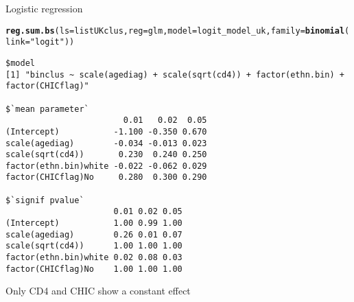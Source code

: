 \documentclass[]{revtex4}\usepackage[]{graphicx}\usepackage[]{color}
\makeatletter
\newcommand{\hlstr}[1]{\textcolor[rgb]{0.192,0.494,0.8}{#1}}%
\newcommand{\hlstd}[1]{\textcolor[rgb]{0.345,0.345,0.345}{#1}}%
\newcommand{\hlkwc}[1]{\textcolor[rgb]{0.333,0.667,0.333}{#1}}%
\newcommand{\hlkwd}[1]{\textcolor[rgb]{0.737,0.353,0.396}{\textbf{#1}}}%
\newenvironment{kframe}{%
 \def\at@end@of@kframe{}%
 \ifinner\ifhmode%
  \def\at@end@of@kframe{\end{minipage}}%
  \begin{minipage}{\columnwidth}%
 \fi\fi%
 \def\FrameCommand##1{\hskip\@totalleftmargin \hskip-\fboxsep
 \colorbox{shadecolor}{##1}\hskip-\fboxsep
     \hskip-\linewidth \hskip-\@totalleftmargin \hskip\columnwidth}%
 \MakeFramed {\advance\hsize-\width
   \@totalleftmargin\z@ \linewidth\hsize
   \@setminipage}}%
 {\par\unskip\endMakeFramed%
 \at@end@of@kframe}
\newenvironment{knitrout}{}{} %
\makeatother
\begin{document}
Logistic regression
\begin{knitrout}
\color{fgcolor}\begin{kframe}
\begin{alltt}
\hlkwd{reg.sum.bs}\hlstd{(}\hlkwc{ls} \hlstd{= listUKclus,} \hlkwc{reg} \hlstd{= glm,} \hlkwc{model} \hlstd{= logit_model_uk,} \hlkwc{family} \hlstd{=} \hlkwd{binomial}\hlstd{(}\hlkwc{link} \hlstd{=} \hlstr{"logit"}\hlstd{))}
\end{alltt}
\begin{verbatim}
$model
[1] "binclus ~ scale(agediag) + scale(sqrt(cd4)) + factor(ethn.bin) + factor(CHICflag)"

$`mean parameter`
                        0.01   0.02  0.05
(Intercept)           -1.100 -0.350 0.670
scale(agediag)        -0.034 -0.013 0.023
scale(sqrt(cd4))       0.230  0.240 0.250
factor(ethn.bin)white -0.022 -0.062 0.029
factor(CHICflag)No     0.280  0.300 0.290

$`signif pvalue`
                      0.01 0.02 0.05
(Intercept)           1.00 0.99 1.00
scale(agediag)        0.26 0.01 0.07
scale(sqrt(cd4))      1.00 1.00 1.00
factor(ethn.bin)white 0.02 0.08 0.03
factor(CHICflag)No    1.00 1.00 1.00
\end{verbatim}
\end{kframe}
\end{knitrout}
Only CD4 and CHIC show a constant effect
\end{document}
